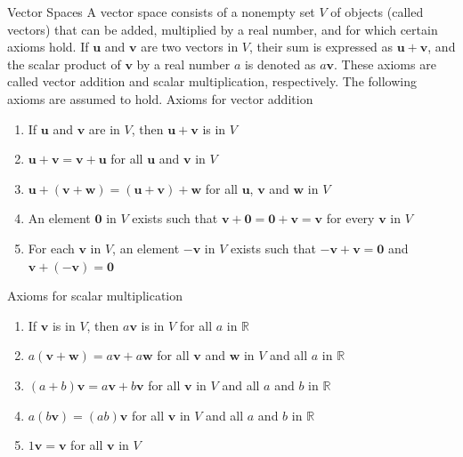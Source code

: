 \documentclass[12pt]{article}
\begin{document}
\begin{definition}{Vector Spaces}{}
    A vector space consists of a nonempty set $ V $ of objects (called vectors) that can be added, multiplied by a real number, and for which certain axioms hold. If $ \mathbf{u} $ and $ \mathbf{v} $ are two vectors in $ V $, their sum is expressed as $ \mathbf{u} + \mathbf{v} $, and the scalar product of $ \mathbf{v} $ by a real number $ a $ is denoted as $ a \mathbf{v} $. These axioms are called vector addition and scalar multiplication, respectively. The following axioms are assumed to hold.
    \medskip
    \newline
    Axioms for vector addition
    \begin{enumerate}[label=(\roman*)]
        \item If $ \mathbf{u} $ and $ \mathbf{v} $ are in $ V $, then $ \mathbf{u} + \mathbf{v} $ is in $ V $
        \item $ \mathbf{u} + \mathbf{v} = \mathbf{v} + \mathbf{u} $ for all $ \mathbf{u} $ and $ \mathbf{v} $ in $ V $
        \item $ \mathbf{u} + \left( \mathbf{v} + \mathbf{w} \right) = \left( \mathbf{u} + \mathbf{v} \right) + \mathbf{w} $ for all $ \mathbf{u} $, $ \mathbf{v} $ and $ \mathbf{w} $ in $ V $
        \item An element $ \mathbf{0} $ in $ V $ exists such that $ \mathbf{v} + \mathbf{0} = \mathbf{0} + \mathbf{v} = \mathbf{v} $ for every $ \mathbf{v} $ in $ V $
        \item For each $ \mathbf{v} $ in $ V $, an element $ -\mathbf{v} $ in $ V $ exists such that $ -\mathbf{v} + \mathbf{v} = \mathbf{0} $ and $ \mathbf{v} + \left( -\mathbf{v} \right) = \mathbf{0} $
    \end{enumerate}
    Axioms for scalar multiplication
    \begin{enumerate}[label=(\roman*)]
        \item If $ \mathbf{v} $ is in $ V $, then $ a \mathbf{v} $ is in $ V $ for all $ a $ in $ \mathbb{R} $
        \item $ a \left( \mathbf{v} + \mathbf{w} \right) = a \mathbf{v} + a \mathbf{w} $ for all $ \mathbf{v} $ and $ \mathbf{w} $ in $ V $ and all $ a $ in $ \mathbb{R} $
        \item $ \left( a + b \right) \mathbf{v} = a \mathbf{v} + b \mathbf{v} $ for all $ \mathbf{v} $ in $ V $ and all $ a $ and $ b $ in $ \mathbb{R} $
        \item $ a \left( b \mathbf{v} \right) = \left( ab \right) \mathbf{v} $ for all $ \mathbf{v} $ in $ V $ and all $ a $ and $ b $ in $ \mathbb{R} $
        \item $ 1 \mathbf{v} = \mathbf{v} $ for all $ \mathbf{v} $ in $ V $
    \end{enumerate}
\end{definition}
\end{document}
